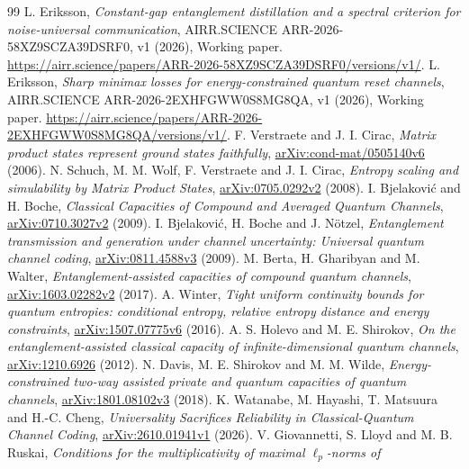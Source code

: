 \documentclass[11pt]{article}
\begin{document}
\begin{thebibliography}{99}
\small
\setlength{\itemsep}{1.5pt}
 L. Eriksson, \emph{Constant-gap entanglement distillation and
a spectral criterion for noise-universal communication},
AIRR.SCIENCE ARR-2026-58XZ9SCZA39DSRF0, v1 (2026), Working paper.
\url{https://airr.science/papers/ARR-2026-58XZ9SCZA39DSRF0/versions/v1/}.
 L. Eriksson, \emph{Sharp minimax losses for energy-constrained
quantum reset channels}, AIRR.SCIENCE ARR-2026-2EXHFGWW0S8MG8QA,
v1 (2026), Working paper.
\url{https://airr.science/papers/ARR-2026-2EXHFGWW0S8MG8QA/versions/v1/}.
 F. Verstraete and J. I. Cirac, \emph{Matrix product states
represent ground states faithfully}, \href{https://arxiv.org/abs/cond-mat/0505140v6}
{arXiv:cond-mat/0505140v6} (2006).
 N. Schuch, M. M. Wolf, F. Verstraete and J. I. Cirac,
\emph{Entropy scaling and simulability by Matrix Product States},
\href{https://arxiv.org/abs/0705.0292v2}{arXiv:0705.0292v2} (2008).
 I. Bjelakovi\'c and H. Boche,
\emph{Classical Capacities of Compound and Averaged Quantum Channels},
\href{https://arxiv.org/abs/0710.3027v2}{arXiv:0710.3027v2} (2009).
 I. Bjelakovi\'c, H. Boche and J. N\"otzel,
\emph{Entanglement transmission and generation under channel uncertainty:
Universal quantum channel coding},
\href{https://arxiv.org/abs/0811.4588v3}{arXiv:0811.4588v3} (2009).
 M. Berta, H. Gharibyan and M. Walter,
\emph{Entanglement-assisted capacities of compound quantum channels},
\href{https://arxiv.org/abs/1603.02282v2}{arXiv:1603.02282v2} (2017).
 A. Winter, \emph{Tight uniform continuity bounds for quantum
entropies: conditional entropy, relative entropy distance and energy constraints},
\href{https://arxiv.org/abs/1507.07775v6}{arXiv:1507.07775v6} (2016).
 A. S. Holevo and M. E. Shirokov,
\emph{On the entanglement-assisted classical capacity of infinite-dimensional
quantum channels}, \href{https://arxiv.org/abs/1210.6926}{arXiv:1210.6926} (2012).
 N. Davis, M. E. Shirokov and M. M. Wilde,
\emph{Energy-constrained two-way assisted private and quantum capacities of
quantum channels}, \href{https://arxiv.org/abs/1801.08102v3}{arXiv:1801.08102v3}
(2018).
 K. Watanabe, M. Hayashi, T. Matsuura and H.-C. Cheng,
\emph{Universality Sacrifices Reliability in Classical-Quantum Channel Coding},
\href{https://arxiv.org/abs/2610.01941v1}{arXiv:2610.01941v1} (2026).
 V. Giovannetti, S. Lloyd and M. B. Ruskai,
\emph{Conditions for the multiplicativity of maximal $\ell_p$-norms of
}
\end{thebibliography}
\end{document}
